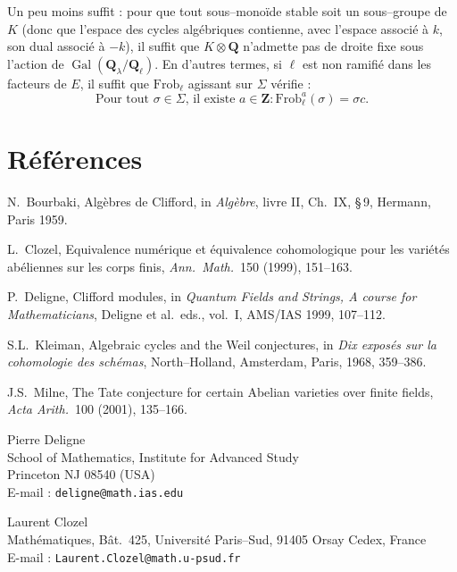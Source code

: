 \documentclass[11pt,a4paper]{article}
\theoremstyle{plain}
\theoremstyle{definition}
\DeclareMathOperator{\Gal}{Gal}
\begin{document}
Un peu moins suffit : pour que tout sous--mono\"ide stable soit un sous--groupe de $K$ (donc que l'espace des cycles alg\'ebriques contienne, avec l'espace associ\'e \`a $k$, son dual associ\'e \`a $-k$), il suffit que $K \otimes \mathbf{Q}$ n'admette pas de droite fixe sous l'action de $\Gal(\mathbf{Q}_\lambda/\mathbf{Q}_\ell)$. En d'autres termes, si $\ell$ est non ramifi\'e dans les facteurs de $E$, il suffit que $\mathrm{Frob}_\ell$ agissant sur $\Sigma$ v\'erifie :
\[
\text{Pour tout } \sigma \in \Sigma\text{, il existe } a \in \mathbf{Z} : \mathrm{Frob}_\ell^a(\sigma) = \sigma c .
\]

\section*{R\'ef\'erences}

\begin{enumerate}[label={[\arabic*]}]
\item N.\ Bourbaki, Alg\`ebres de Clifford, in \textit{Alg\`ebre}, livre II, Ch.~IX, \S\,9, Hermann, Paris 1959.
\item L.\ Clozel, Equivalence num\'erique et \'equivalence cohomologique pour les vari\'et\'es ab\'eliennes sur les corps finis, \textit{Ann.\ Math.}\ 150 (1999), 151--163.
\item P.\ Deligne, Clifford modules, in \textit{Quantum Fields and Strings, A course for Mathematicians}, Deligne et al.\ eds., vol.~I, AMS/IAS 1999, 107--112.
\item S.L.\ Kleiman, Algebraic cycles and the Weil conjectures, in \textit{Dix expos\'es sur la cohomologie des sch\'emas}, North--Holland, Amsterdam, Paris, 1968, 359--386.
\item J.S.\ Milne, The Tate conjecture for certain Abelian varieties over finite fields, \textit{Acta Arith.}\ 100 (2001), 135--166.
\end{enumerate}

\vspace{1em}

\noindent
Pierre Deligne\\
School of Mathematics, Institute for Advanced Study\\
Princeton NJ 08540 (USA)\\
E-mail : \texttt{deligne@math.ias.edu}

\vspace{0.5em}

\noindent
Laurent Clozel\\
Math\'ematiques, B\^at.~425, Universit\'e Paris--Sud, 91405 Orsay Cedex, France\\
E-mail : \texttt{Laurent.Clozel@math.u-psud.fr}
\end{document}

